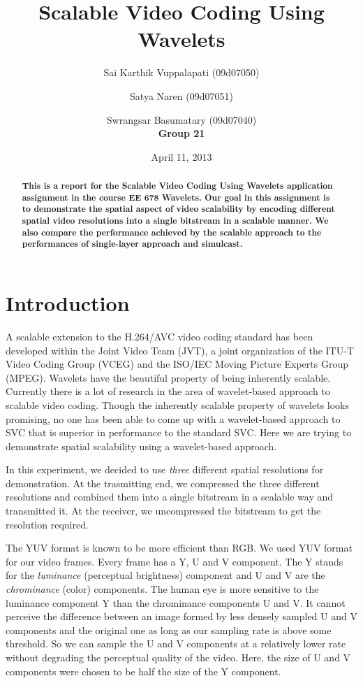 \documentclass[10pt,twocolumn]{article}
\title{Scalable Video Coding Using Wavelets}
\author{Sai Karthik Vuppalapati (09d07050) \\
\and Satya Naren (09d07051) \\
\and Swrangsar Basumatary (09d07040) \\
\textbf{Group 21}}
\date{April 11, 2013}
\begin{document}
\maketitle

\begin{abstract}
    \textbf{This is a report for the Scalable Video Coding Using Wavelets application assignment in the course EE 678 Wavelets. Our goal in this assignment is to demonstrate the spatial aspect of video scalability by encoding different spatial video resolutions into a single bitstream in a scalable manner. We also compare the performance achieved by the scalable approach to the performances of single-layer approach and simulcast.}
\end{abstract}

\section{Introduction}
A scalable extension to the H.264/AVC video coding standard has been developed within the Joint Video Team (JVT), a joint organization of the ITU-T Video Coding Group (VCEG) and the ISO/IEC Moving Picture Experts Group (MPEG)\cite{segall2007}. Wavelets have the beautiful property of being inherently scalable\cite{daubechies1990, daubechies1996}. Currently there is a lot of research in the area of wavelet-based approach to scalable video coding\cite{signoroni2007}. Though the inherently scalable property of wavelets looks promising, no one has been able to come up with a wavelet-based approach to SVC that is superior in performance to the standard SVC. Here we are trying to demonstrate spatial scalability using a wavelet-based approach.

In this experiment, we decided to use \emph{three} different spatial resolutions for demonstration. At the trasmitting end, we compressed the three different resolutions and combined them into a single bitstream in a scalable way and transmitted it. At the receiver, we uncompressed the bitstream to get the resolution required.

The YUV format is known to be more efficient than RGB. We used YUV format for our video frames. Every frame has a Y, U and V component. The Y stands for the \emph{luminance} (perceptual brightness) component and U and V are the \emph{chrominance} (color) components.  The human eye is more sensitive to the luminance component Y than the chrominance components U and V. It cannot perceive the difference between an image formed by less densely sampled U and V components and the original one as long as our sampling rate is above some threshold. So we can sample the U and V components at a relatively lower rate without degrading the perceptual quality of the video. Here, the size of U and V components were chosen to be half the size of the Y component.
\end{document}
